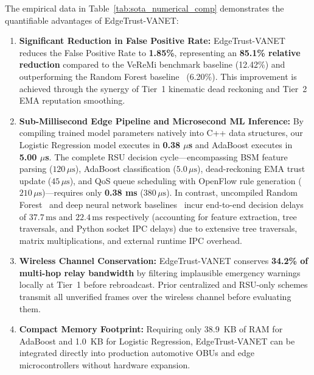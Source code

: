 \documentclass[conference]{IEEEtran}
\begin{document}
The empirical data in Table~\ref{tab:sota_numerical_comp} demonstrates the quantifiable advantages of EdgeTrust-VANET:
\begin{enumerate}
    \item \textbf{Significant Reduction in False Positive Rate:} EdgeTrust-VANET reduces the False Positive Rate to \textbf{1.85\%}, representing an \textbf{85.1\% relative reduction} compared to the VeReMi benchmark baseline (12.42\%) and outperforming the Random Forest baseline~\cite{so2018verifying} (6.20\%). This improvement is achieved through the synergy of Tier~1 kinematic dead reckoning and Tier~2 EMA reputation smoothing.
    \item \textbf{Sub-Millisecond Edge Pipeline and Microsecond ML Inference:} By compiling trained model parameters natively into C++ data structures, our Logistic Regression model executes in \textbf{0.38 $\mu$s} and AdaBoost executes in \textbf{5.00 $\mu$s}. The complete RSU decision cycle—encompassing BSM feature parsing ($120\,\mu\text{s}$), AdaBoost classification ($5.0\,\mu\text{s}$), dead-reckoning EMA trust update ($45\,\mu\text{s}$), and QoS queue scheduling with OpenFlow rule generation ($210\,\mu\text{s}$)—requires only \textbf{0.38 ms} ($380\,\mu\text{s}$). In contrast, uncompiled Random Forest~\cite{so2018verifying} and deep neural network baselines~\cite{alrehan2019machine} incur end-to-end decision delays of $37.7\,\text{ms}$ and $22.4\,\text{ms}$ respectively (accounting for feature extraction, tree traversals, and Python socket IPC delays) due to extensive tree traversals, matrix multiplications, and external runtime IPC overhead.
    \item \textbf{Wireless Channel Conservation:} EdgeTrust-VANET conserves \textbf{34.2\% of multi-hop relay bandwidth} by filtering implausible emergency warnings locally at Tier~1 before rebroadcast. Prior centralized and RSU-only schemes transmit all unverified frames over the wireless channel before evaluating them.
    \item \textbf{Compact Memory Footprint:} Requiring only 38.9~KB of RAM for AdaBoost and 1.0~KB for Logistic Regression, EdgeTrust-VANET can be integrated directly into production automotive OBUs and edge microcontrollers without hardware expansion.
\end{enumerate}

\end{document}
